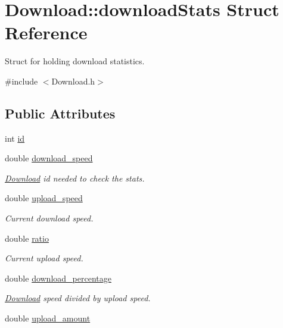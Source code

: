 \hypertarget{structDownload_1_1downloadStats}{
\section{Download::downloadStats Struct Reference}
\label{structDownload_1_1downloadStats}
}


Struct for holding download statistics.  




{\ttfamily \#include $<$Download.h$>$}

\subsection*{Public Attributes}
\begin{DoxyCompactItemize}
\item 
int \hyperlink{structDownload_1_1downloadStats_a57f7994e7813d6d4705fd5081c9ed255}{id}
\item 
double \hyperlink{structDownload_1_1downloadStats_aacc99279e14b96fd00be47ae7fac9a53}{download\_\-speed}
\begin{DoxyCompactList}\small\item\em \hyperlink{classDownload}{Download} id needed to check the stats. \end{DoxyCompactList}\item 
double \hyperlink{structDownload_1_1downloadStats_a300c31d25c8b994966fe4a792ae8879b}{upload\_\-speed}
\begin{DoxyCompactList}\small\item\em Current download speed. \end{DoxyCompactList}\item 
double \hyperlink{structDownload_1_1downloadStats_a90933a4bec5ccd3682451495b240b71d}{ratio}
\begin{DoxyCompactList}\small\item\em Current upload speed. \end{DoxyCompactList}\item 
double \hyperlink{structDownload_1_1downloadStats_a173f29240d01632fb4b13a00db9200ad}{download\_\-percentage}
\begin{DoxyCompactList}\small\item\em \hyperlink{classDownload}{Download} speed divided by upload speed. \end{DoxyCompactList}\item 
double \hyperlink{structDownload_1_1downloadStats_ac4620bb4ee41620cfed4303ebfd37d4f}{upload\_\-amount}

\end{DoxyCompactItemize}
